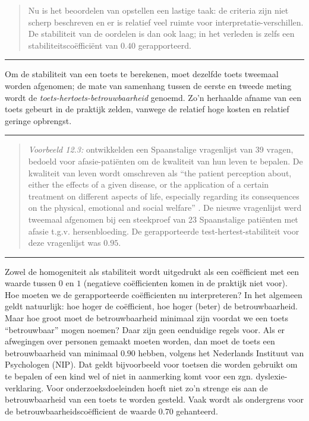 \documentclass[
]{book}
\begin{document}
\begin{quote}
Nu is het beoordelen van opstellen een lastige taak: de criteria zijn
niet scherp beschreven en er is relatief veel ruimte voor
interpretatie-verschillen. De stabiliteit van de oordelen is dan ook
laag; in het verleden is zelfs een stabiliteitscoëfficiënt van \(0.40\)
gerapporteerd.
\end{quote}

\begin{center}\rule{0.5\linewidth}{0.5pt}\end{center}

Om de stabiliteit van een toets te berekenen, moet dezelfde toets
tweemaal worden afgenomen; de mate van samenhang tussen de eerste en
tweede meting wordt de \emph{toets-hertoets-betrouwbaarheid} genoemd. Zo'n
herhaalde afname van een toets gebeurt in de praktijk zelden, vanwege de
relatief hoge kosten en relatief geringe opbrengst.

\begin{center}\rule{0.5\linewidth}{0.5pt}\end{center}

\begin{quote}
\emph{Voorbeeld 12.3:}
\citep{Lata09} ontwikkelden
een Spaanstalige vragenlijst van 39 vragen, bedoeld voor
afasie-patiënten om de kwaliteit van hun leven te bepalen. De kwaliteit
van leven wordt omschreven als ``the patient perception about, either the
effects of a given disease, or the application of a certain treatment on
different aspects of life, especially regarding its consequences on the
physical, emotional and social welfare'' \citep[ p.379]{Lata09}. De nieuwe
vragenlijst werd tweemaal afgenomen bij een steekproef van 23
Spaanstalige patiënten met afasie t.g.v. hersenbloeding. De
gerapporteerde test-hertest-stabiliteit voor deze vragenlijst was
\(0.95\).
\end{quote}

\begin{center}\rule{0.5\linewidth}{0.5pt}\end{center}

Zowel de homogeniteit als stabiliteit wordt uitgedrukt als een
coëfficient met een waarde tussen \(0\) en \(1\) (negatieve coëfficienten
komen in de praktijk niet voor). Hoe moeten we de gerapporteerde
coëfficienten nu interpreteren? In het algemeen geldt natuurlijk: hoe
hoger de coëfficient, hoe hoger (beter) de betrouwbaarheid. Maar hoe
groot moet de betrouwbaarheid minimaal zijn voordat we een toets
``betrouwbaar'' mogen noemen? Daar zijn geen eenduidige regels voor. Als
er afwegingen over personen gemaakt moeten worden, dan moet de toets een
betrouwbaarheid van minimaal \(0.90\) hebben, volgens het Nederlands
Instituut van Psychologen (NIP). Dat geldt bijvoorbeeld voor toetsen die
worden gebruikt om te bepalen of een kind wel of niet in aanmerking komt
voor een zgn. dyslexie-verklaring. Voor onderzoeksdoeleinden hoeft niet
zo'n strenge eis aan de betrouwbaarheid van een toets te worden gesteld.
Vaak wordt als ondergrens voor de betrouwbaarheidscoëfficient de waarde
\(0.70\) gehanteerd.
\end{document}
